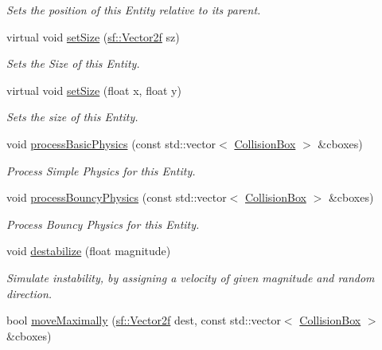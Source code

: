 \begin{DoxyCompactItemize}
\begin{DoxyCompactList}\small\item\em Sets the position of this Entity relative to its parent. \end{DoxyCompactList}\item 
virtual void \mbox{\hyperlink{class_colliding_entity_afb754ae08b727d2e776e7547ac4e9b3a}{set\+Size}} (\mbox{\hyperlink{classsf_1_1_vector2}{sf\+::\+Vector2f}} sz)
\begin{DoxyCompactList}\small\item\em Sets the Size of this Entity. \end{DoxyCompactList}\item 
virtual void \mbox{\hyperlink{class_colliding_entity_aec793f5e99ac4d22c8e221fb0d13b3db}{set\+Size}} (float x, float y)
\begin{DoxyCompactList}\small\item\em Sets the size of this Entity. \end{DoxyCompactList}\item 
void \mbox{\hyperlink{class_colliding_entity_a61a9dd0ab794db0bd545291cef4c1b40}{process\+Basic\+Physics}} (const std\+::vector$<$ \mbox{\hyperlink{class_collision_box}{Collision\+Box}} $>$ \&cboxes)
\begin{DoxyCompactList}\small\item\em Process Simple Physics for this Entity. \end{DoxyCompactList}\item 
void \mbox{\hyperlink{class_colliding_entity_a72f52aeb8e29433962cce9579292ab2b}{process\+Bouncy\+Physics}} (const std\+::vector$<$ \mbox{\hyperlink{class_collision_box}{Collision\+Box}} $>$ \&cboxes)
\begin{DoxyCompactList}\small\item\em Process Bouncy Physics for this Entity. \end{DoxyCompactList}\item 
void \mbox{\hyperlink{class_colliding_entity_a15c9c43a0ffa68a7c1ed94bb0230e150}{destabilize}} (float magnitude)
\begin{DoxyCompactList}\small\item\em Simulate instability, by assigning a velocity of given magnitude and random direction. \end{DoxyCompactList}\item 
bool \mbox{\hyperlink{class_colliding_entity_ac0d229da4e16008922ad0c018002e747}{move\+Maximally}} (\mbox{\hyperlink{classsf_1_1_vector2}{sf\+::\+Vector2f}} dest, const std\+::vector$<$ \mbox{\hyperlink{class_collision_box}{Collision\+Box}} $>$ \&cboxes)

\end{DoxyCompactItemize}
